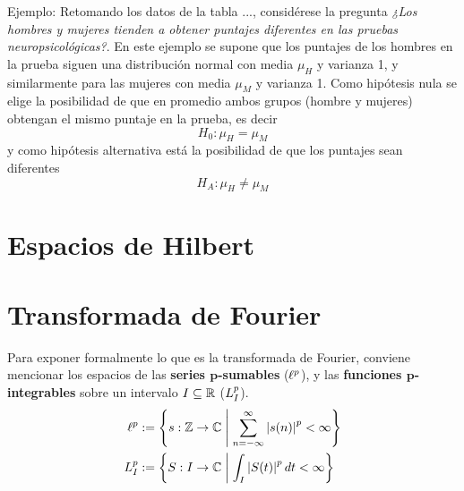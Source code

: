 Ejemplo:
Retomando los datos de la tabla ..., considérese la pregunta \textit{¿Los hombres y mujeres tienden
a obtener puntajes diferentes en las pruebas neuropsicológicas?}. 
%
En este ejemplo se supone que los puntajes de los hombres en la prueba siguen una distribución normal con media $\mu_H$ y varianza 1, y similarmente para las mujeres con media $\mu_M$ y varianza 1.
%
Como hipótesis nula se elige la posibilidad de que en promedio ambos grupos (hombre y mujeres) obtengan el mismo puntaje en la prueba, es decir
\begin{equation}
H_0 : \mu_H = \mu_M
\end{equation}
y como hipótesis alternativa está la posibilidad de que los puntajes sean diferentes
\begin{equation}
H_A : \mu_H \neq \mu_M
\end{equation}

%


\section{Espacios de Hilbert}

\section{Transformada de Fourier}
\label{sec:fourier1}

Para exponer formalmente lo que es la transformada de Fourier, conviene mencionar los espacios de 
las \textbf{series $\boldsymbol{p}$-sumables} ($\ell^{p}$), y las  \textbf{funciones 
$\boldsymbol{p}$-integrables} sobre un intervalo $I \subseteq \mathbb{R}$ ($L^{p}_I$).
\begin{align*}
\ell^{p} &:= \left\{ s: \mathbb{Z}\rightarrow\mathbb{C} \mathrel{}\middle|\mathrel{} \sum_{n=-\infty}^{\infty} \left| s(n) \right|^{p} < \infty \right\}
\\
L^{p}_I &:= \left\{ S: I\rightarrow\mathbb{C} \mathrel{}\middle|\mathrel{} \int_I \left| S(t) \right|^{p} dt < \infty \right\}
\end{align*}

